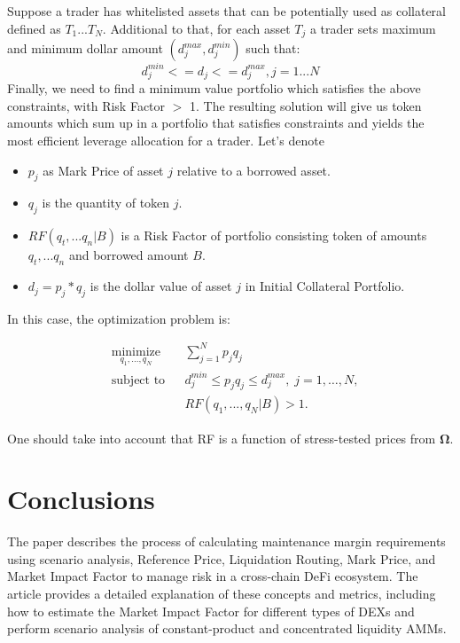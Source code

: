 \documentclass[conference]{IEEEtran}
\begin{document}
Suppose a trader has whitelisted assets that can be potentially used as collateral defined as $T_{1}...T_{N}$. Additional to that, for each asset $T_{j}$ a trader sets maximum and minimum dollar amount $(d^{max}_{j}, d^{min}_{j})$ such that: $$d^{min}_{j}<=d_{j}<=d^{max}_{j}, j=1...N$$ Finally, we need to find a minimum value portfolio which satisfies the above constraints, with Risk Factor $>$ 1. The resulting solution will give us token amounts which sum up in a portfolio that satisfies constraints and yields the most efficient leverage allocation for a trader.  
Let's denote \begin{itemize}
	\item  $p_{j}$ as Mark Price of asset $j$ relative to a borrowed asset.
	\item  $q_{j}$ is the quantity of token $j$.
	\item $RF(q_{t},...q_{n}|B)$ is a Risk Factor of portfolio consisting token of amounts $q_{t},...q_{n}$ and borrowed amount $B$.
	\item $d_{j} = p_{j}*q_{j}$ is the dollar value of asset $j$ in Initial Collateral Portfolio.
	\end{itemize}

In this case, the optimization problem is: 

\begin{equation*}
\begin{aligned}
& \underset{q_{1},...,q_{N}}{\text{minimize}}
& & \sum_{j=1}^{N} p_{j} q_{j} \\
& \text{subject to}
& & d^{min}_{j} \leq p_{j} q_{j} \leq d^{max}_{j}, \; j = 1, \ldots, N, \\
&&& RF(q_{1},...,q_{N}|B) > 1.
\end{aligned}
\end{equation*}

One should take into account that RF is a function of stress-tested prices from $\boldsymbol{\Omega}$.

\section{Conclusions}
The paper describes the process of calculating maintenance margin requirements using scenario analysis, Reference Price, Liquidation Routing, Mark Price, and Market Impact Factor to manage risk in a cross-chain DeFi ecosystem. The article provides a detailed explanation of these concepts and metrics, including how to estimate the Market Impact Factor for different types of DEXs and perform scenario analysis of constant-product and concentrated liquidity AMMs. 
\end{document}
